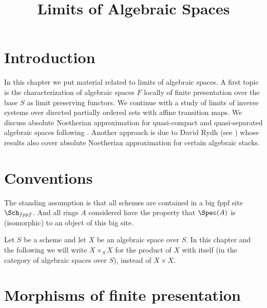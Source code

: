 

%


\title{Limits of Algebraic Spaces}


\maketitle

\label{section-phantom}

\tableofcontents

\section{Introduction}
\label{section-introduction}

\noindent
In this chapter we put material related to limits of algebraic spaces.
A first topic is the characterization of algebraic spaces $F$ locally
of finite presentation over the base $S$ as limit preserving functors.
We continue with a study of limits of inverse systems over directed
partially ordered sets with affine transition maps. We discuss absolute
Noetherian approximation for quasi-compact and quasi-separated algebraic
spaces following \cite{CLO}. Another approach is due to David Rydh (see
\cite{rydh_approx}) whose results also cover absolute Noetherian
approximation for certain algebraic stacks.


\section{Conventions}
\label{section-conventions}

\noindent
The standing assumption is that all schemes are contained in
a big fppf site $\Sch_{fppf}$. And all rings $A$ considered
have the property that $\Spec(A)$ is (isomorphic) to an
object of this big site.

\medskip\noindent
Let $S$ be a scheme and let $X$ be an algebraic space over $S$.
In this chapter and the following we will write $X \times_S X$
for the product of $X$ with itself (in the category of algebraic
spaces over $S$), instead of $X \times X$.











\section{Morphisms of finite presentation}
\label{section-finite-presentation}

